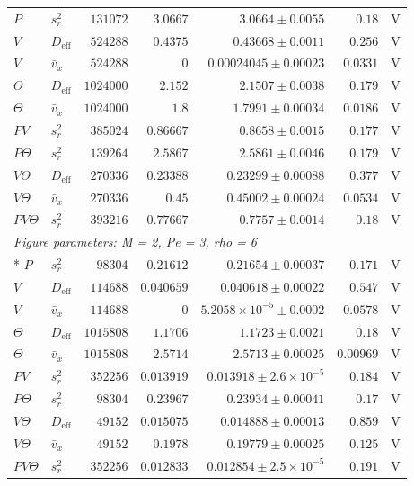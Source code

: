 \begin{longtable}{llrrrrc}
$P$ & $s_r^2$ & $131072$ & $3.0667$ & $3.0664 \pm 0.0055$ & $0.18$ & V \\
$V$ & $D_{\mathrm{eff}}$ & $524288$ & $0.4375$ & $0.43668 \pm 0.0011$ & $0.256$ & V \\
$V$ & $\bar v_x$ & $524288$ & $0$ & $0.00024045 \pm 0.00023$ & $0.0331$ & V \\
$\Theta$ & $D_{\mathrm{eff}}$ & $1024000$ & $2.152$ & $2.1507 \pm 0.0038$ & $0.179$ & V \\
$\Theta$ & $\bar v_x$ & $1024000$ & $1.8$ & $1.7991 \pm 0.00034$ & $0.0186$ & V \\
$PV$ & $s_r^2$ & $385024$ & $0.86667$ & $0.8658 \pm 0.0015$ & $0.177$ & V \\
$P\Theta$ & $s_r^2$ & $139264$ & $2.5867$ & $2.5861 \pm 0.0046$ & $0.179$ & V \\
$V\Theta$ & $D_{\mathrm{eff}}$ & $270336$ & $0.23388$ & $0.23299 \pm 0.00088$ & $0.377$ & V \\
$V\Theta$ & $\bar v_x$ & $270336$ & $0.45$ & $0.45002 \pm 0.00024$ & $0.0534$ & V \\
$PV\Theta$ & $s_r^2$ & $393216$ & $0.77667$ & $0.7757 \pm 0.0014$ & $0.18$ & V \\
\multicolumn{7}{l}{\textit{Figure parameters: M = 2, Pe = 3, rho = 6}} \\*
$P$ & $s_r^2$ & $98304$ & $0.21612$ & $0.21654 \pm 0.00037$ & $0.171$ & V \\
$V$ & $D_{\mathrm{eff}}$ & $114688$ & $0.040659$ & $0.040618 \pm 0.00022$ & $0.547$ & V \\
$V$ & $\bar v_x$ & $114688$ & $0$ & $5.2058\times10^{-5} \pm 0.0002$ & $0.0578$ & V \\
$\Theta$ & $D_{\mathrm{eff}}$ & $1015808$ & $1.1706$ & $1.1723 \pm 0.0021$ & $0.18$ & V \\
$\Theta$ & $\bar v_x$ & $1015808$ & $2.5714$ & $2.5713 \pm 0.00025$ & $0.00969$ & V \\
$PV$ & $s_r^2$ & $352256$ & $0.013919$ & $0.013918 \pm 2.6\times10^{-5}$ & $0.184$ & V \\
$P\Theta$ & $s_r^2$ & $98304$ & $0.23967$ & $0.23934 \pm 0.00041$ & $0.17$ & V \\
$V\Theta$ & $D_{\mathrm{eff}}$ & $49152$ & $0.015075$ & $0.014888 \pm 0.00013$ & $0.859$ & V \\
$V\Theta$ & $\bar v_x$ & $49152$ & $0.1978$ & $0.19779 \pm 0.00025$ & $0.125$ & V \\
$PV\Theta$ & $s_r^2$ & $352256$ & $0.012833$ & $0.012854 \pm 2.5\times10^{-5}$ & $0.191$ & V \\

\end{longtable}
